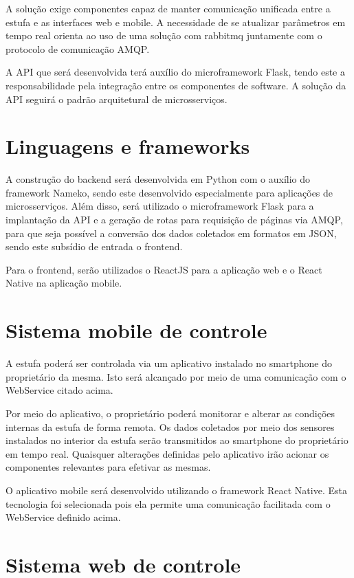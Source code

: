 A solução exige componentes capaz de manter comunicação unificada entre a estufa e as interfaces web e mobile. A necessidade de se atualizar parâmetros em tempo real orienta ao uso de uma solução com rabbitmq juntamente com o protocolo de comunicação AMQP. 

A API que será desenvolvida terá auxílio do microframework Flask, tendo este a responsabilidade pela integração entre os componentes de software. A solução da API seguirá o padrão arquitetural de microsserviços. 

\section{Linguagens e frameworks}

A construção do backend será desenvolvida em Python com o auxílio do framework Nameko, sendo este desenvolvido especialmente para aplicações de microsserviços. Além disso, será utilizado o microframework Flask para a implantação da API e a geração de rotas para requisição de páginas via AMQP, para que seja possível a conversão dos dados coletados em formatos em JSON, sendo este subsídio de entrada o frontend. \cite{rocha}

Para o frontend, serão utilizados o ReactJS para a aplicação web e o React Native na aplicação mobile. 

\section{Sistema mobile de controle}

A estufa poderá ser controlada via um aplicativo instalado no smartphone do proprietário da mesma. Isto será alcançado por meio de uma comunicação com o WebService citado acima.

Por meio do aplicativo, o proprietário poderá monitorar e alterar as condições internas da estufa de forma remota. Os dados coletados por meio dos sensores instalados no interior da estufa serão transmitidos ao smartphone do proprietário em tempo real. Quaisquer alterações definidas pelo aplicativo irão acionar os componentes relevantes para efetivar as mesmas.

O aplicativo mobile será desenvolvido utilizando o framework React Native. Esta tecnologia foi selecionada pois ela permite uma comunicação facilitada com o WebService definido acima.

\section{Sistema web de controle}

